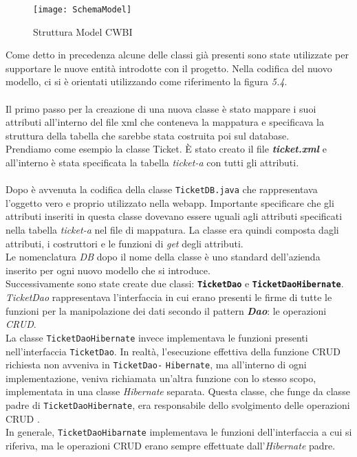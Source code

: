 \begin{figure}[H]
    \centering 
    \texttt{[image: SchemaModel]} 
    \bigskip
    \caption{Struttura Model CWBI}
\end{figure}

\noindent
Come detto in precedenza alcune delle classi già presenti sono state utilizzate per supportare le nuove entità introdotte con il progetto. Nella codifica del nuovo modello, ci si è orientati utilizzando come riferimento la figura \textit{5.4}. \\
\\
\noindent
Il primo passo per la creazione di una nuova classe è stato mappare i suoi attributi all'interno del file xml che conteneva la mappatura e specificava la struttura della tabella che sarebbe stata costruita poi sul database. \\
Prendiamo come esempio la classe Ticket. È stato creato il file \textit{\textbf{ticket.xml}} e all'interno è stata specificata la tabella \textit{ticket-a} con tutti gli attributi.\\
\\
\noindent
Dopo è avvenuta la codifica della classe \texttt{TicketDB.java} che rappresentava l'oggetto vero e proprio utilizzato nella  webapp. Importante specificare che gli attributi inseriti in questa classe dovevano essere uguali agli attributi specificati nella tabella   \textit{ticket-a} nel file di mappatura. La classe era quindi composta  dagli attributi, i costruttori e le funzioni di \textit{get} degli attributi.\\
Le nomenclatura \textit{DB} dopo il nome della classe è uno standard dell'azienda inserito per ogni nuovo modello che si introduce.
\\
\noindent
Successivamente sono state create due classi: \texttt{\textbf{TicketDao}} e \texttt{\textbf{TicketDaoHibernate}}. \\
\textit{TicketDao} rappresentava l'interfaccia in cui erano presenti le firme di tutte le funzioni per la manipolazione dei dati secondo il pattern \textit{\textbf{Dao\glsfirstoccur}}: le operazioni \textit{CRUD\glsfirstoccur}. \\
La classe \texttt{TicketDaoHibernate} invece implementava le funzioni presenti nell'interfaccia \texttt{TicketDao}.
In realtà, l'esecuzione effettiva della funzione CRUD richiesta non avveniva in \texttt{TicketDao-} \texttt{Hibernate}, ma all'interno di ogni implementazione, veniva richiamata un'altra funzione con lo stesso scopo, implementata in una classe \textit{Hibernate} separata. Questa classe, che funge da classe padre di \texttt{TicketDaoHibernate}, era responsabile dello svolgimento delle operazioni CRUD . \\
In generale, \texttt{TicketDaoHibarnate} implementava le funzioni dell'interfaccia a cui si riferiva, ma le operazioni CRUD erano sempre effettuate dall'\textit{Hibernate} padre.\\

